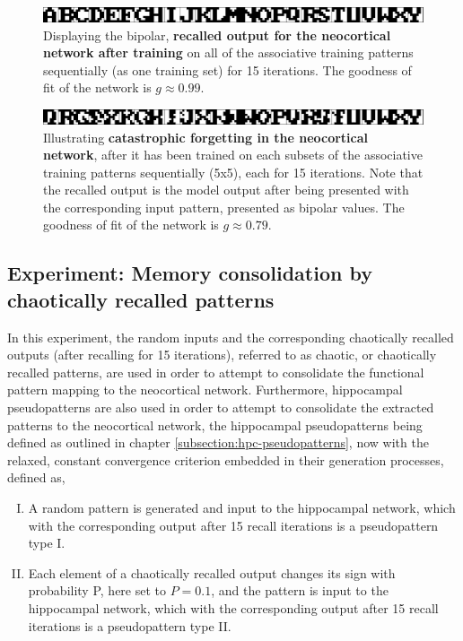 \begin{figure}
    \centering
    \includegraphics[width=13cm]{fig/neo-intro-demo/global_aggregate_im}
    \caption{Displaying the bipolar, \textbf{recalled output for the neocortical network after training} on all of the associative training patterns sequentially (as one training set) for 15 iterations. The goodness of fit of the network is $g\approx0.99$.}
    \label{fig:global_aggregate_im}
\end{figure}

\begin{figure}
    \centering
    \includegraphics[width=13cm]{fig/neo-intro-demo/local_aggregate_im}
    \caption{Illustrating \textbf{catastrophic forgetting in the neocortical network}, after it has been trained on each subsets of the associative training patterns sequentially (5x5), each for 15 iterations. Note that the recalled output is the model output after being presented with the corresponding input pattern, presented as bipolar values. The goodness of fit of the network is $g\approx0.79$.}
    \label{fig:local_aggregate_im}
\end{figure}

\subsection{Experiment: Memory consolidation by chaotically recalled patterns}\label{subsect:rand-in-chaotic-out}

In this experiment, the random inputs and the corresponding chaotically recalled outputs (after recalling for 15 iterations), referred to as chaotic, or chaotically recalled patterns, are used in order to attempt to consolidate the functional pattern mapping to the neocortical network. Furthermore, hippocampal pseudopatterns are also used in order to attempt to consolidate the extracted patterns to the neocortical network, the hippocampal pseudopatterns being defined as outlined in chapter \ref{subsection:hpc-pseudopatterns}, now with the relaxed, constant convergence criterion embedded in their generation processes, defined as,

\begin{enumerate}[I.]
    \item A random pattern is generated and input to the hippocampal network, which with the corresponding output after 15 recall iterations is a pseudopattern type I.
    \item Each element of a chaotically recalled output changes its sign with probability P, here set to $P=0.1$, and the pattern is input to the hippocampal network, which with the corresponding output after 15 recall iterations is a pseudopattern type II.
\end{enumerate}

